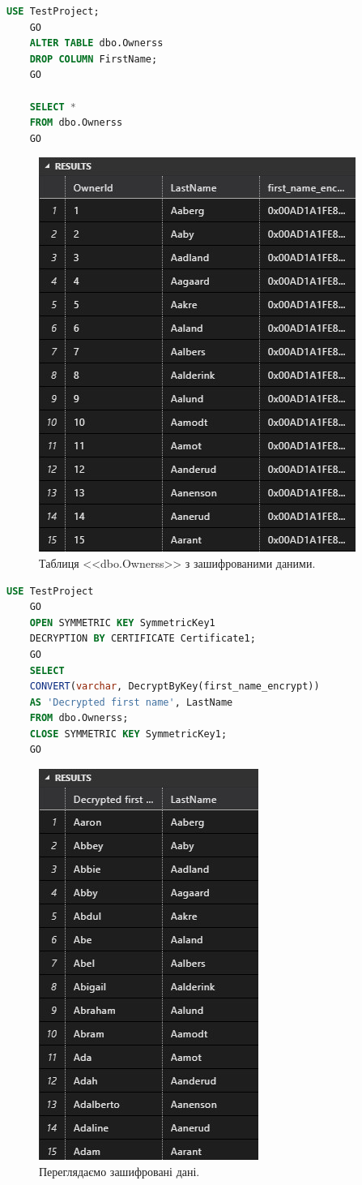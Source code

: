 \documentclass[a4paper,12pt]{article}
\begin{document}
\newpage
	\begin{lstlisting}[language=SQL]
	USE TestProject;
	GO
	ALTER TABLE dbo.Ownerss
	DROP COLUMN FirstName;
	GO
	
	SELECT *
	FROM dbo.Ownerss
	GO
	\end{lstlisting}
	\begin{figure}[h!]
		\begin{minipage}[h]{1\linewidth}
			\centering
			\includegraphics[width=0.5\linewidth]{Prt sc/Figure_1.jpg}  
		\end{minipage}
		\caption{Таблиця <<dbo.Ownerss>> з зашифрованими даними.}
	\end{figure}
	\begin{lstlisting}[language=SQL]
	USE TestProject
	GO
	OPEN SYMMETRIC KEY SymmetricKey1
	DECRYPTION BY CERTIFICATE Certificate1;
	GO
	SELECT 
	CONVERT(varchar, DecryptByKey(first_name_encrypt)) 
	AS 'Decrypted first name', LastName
	FROM dbo.Ownerss;
	CLOSE SYMMETRIC KEY SymmetricKey1;
	GO
	\end{lstlisting}
	\begin{figure}[h!]
		\begin{minipage}[h]{1\linewidth}
			\centering
			\includegraphics[width=0.5\linewidth]{Prt sc/Figure_2.jpg}  
		\end{minipage}
		\caption{Переглядаємо зашифровані дані.}
	\end{figure}
\end{document}
